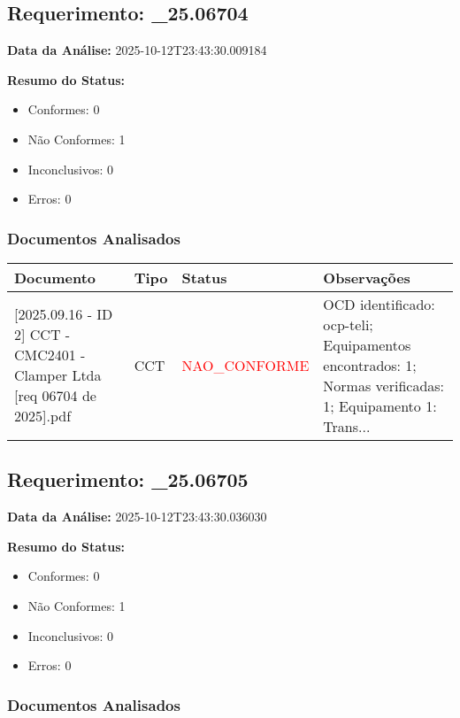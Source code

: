 \documentclass[12pt,a4paper]{article}
\begin{document}
\subsection{Requerimento: \_25.06704}

\textbf{Data da Análise:} 2025-10-12T23:43:30.009184

\textbf{Resumo do Status:}
\begin{itemize}
    \item Conformes: 0
    \item Não Conformes: 1
    \item Inconclusivos: 0
    \item Erros: 0
\end{itemize}

\subsubsection{Documentos Analisados}

\begin{longtable}{|p{4cm}|p{2cm}|p{2cm}|p{6cm}|}
\hline
\textbf{Documento} & \textbf{Tipo} & \textbf{Status} & \textbf{Observações} \\
\hline
\endhead
[Certificado de Conformidade Técnica - CCT][2025.09.16 - ID 2] CCT - CMC2401 - Clamper Ltda [req 06704 de  2025].pdf & CCT & \textcolor{red}{NAO\_CONFORME} & OCD identificado: ocp-teli; Equipamentos encontrados: 1; Normas verificadas: 1; Equipamento 1: Trans... \\
\hline
\end{longtable}


\subsection{Requerimento: \_25.06705}

\textbf{Data da Análise:} 2025-10-12T23:43:30.036030

\textbf{Resumo do Status:}
\begin{itemize}
    \item Conformes: 0
    \item Não Conformes: 1
    \item Inconclusivos: 0
    \item Erros: 0
\end{itemize}

\subsubsection{Documentos Analisados}
\end{document}
